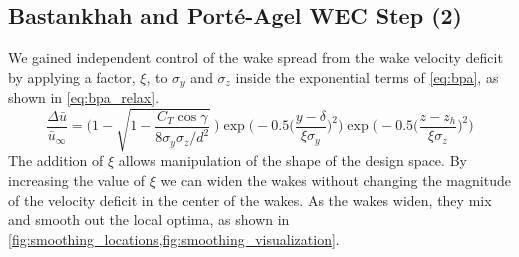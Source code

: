 \documentclass[a4paper]{jpconf}
\begin{document}
\subsection{Bastankhah and Port\'e-Agel WEC Step (2)}
We gained independent control of the wake spread from the wake velocity deficit by applying a factor, $\xi$, to $\sigma_y$ and $\sigma_z$ inside the exponential terms of \cref{eq:bpa}, as shown in \cref{eq:bpa_relax}.
\begin{equation}
	\frac{\Delta \bar{u}}{\bar{u}_{\infty}} = \Bigg(1-\sqrt{1-\frac{C_T \cos{\gamma}}{8 \sigma_y \sigma_z/d^2}}~\Bigg) \exp{\bigg(-0.5\Big(\frac{y-\delta}{\xi \sigma_y}\Big)^2\bigg)}\exp{\bigg(-0.5\Big(\frac{z-z_h}{\xi \sigma_z}\Big)^2\bigg)}
\label{eq:bpa_relax}
\end{equation}
The addition of $\xi$ allows manipulation of the shape of the design space. By increasing the value of $\xi$ we can widen the wakes without changing the magnitude of the velocity deficit in the center of the wakes. As the wakes widen, they mix and smooth out the local optima, as shown in \cref{fig:smoothing_locations,fig:smoothing_visualization}. 
%
\end{document}
